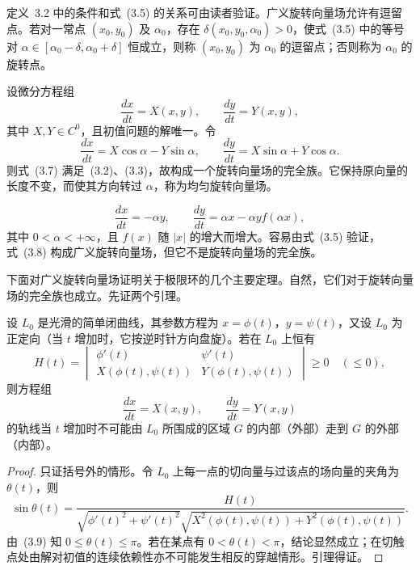 定义~3.2 中的条件和式~(3.5) 的关系可由读者验证。广义旋转向量场允许有逗留点。若对一常点 $(x_0,y_0)$ 及 $\alpha_0$，存在 $\delta(x_0,y_0,\alpha_0)>0$，使式~(3.5) 中的等号对 $\alpha\in[\alpha_0-\delta,\alpha_0+\delta]$ 恒成立，则称 $(x_0,y_0)$ 为 $\alpha_0$ 的逗留点；否则称为 $\alpha_0$ 的旋转点。

\begin{example}{}{}
设微分方程组
\[
 \dfrac{dx}{dt}=X(x,y),\qquad \dfrac{dy}{dt}=Y(x,y), \tag{3.6}
\]
其中 $X,Y\in C^0$，且初值问题的解唯一。令
\[
 \dfrac{dx}{dt}=X\cos\alpha-Y\sin\alpha,\qquad
 \dfrac{dy}{dt}=X\sin\alpha+Y\cos\alpha. \tag{3.7}
\]
则式~(3.7) 满足~(3.2)、(3.3)，故构成一个旋转向量场的完全族。它保持原向量的长度不变，而使其方向转过 $\alpha$，称为均匀旋转向量场。
\end{example}

\begin{example}{}{}
\[
 \dfrac{dx}{dt}=-\alpha y,\qquad
 \dfrac{dy}{dt}=\alpha x-\alpha y f(\alpha x), \tag{3.8}
\]
其中 $0<\alpha<+\infty$，且 $f(x)$ 随 $|x|$ 的增大而增大。容易由式~(3.5) 验证，式~(3.8) 构成广义旋转向量场，但它不是旋转向量场的完全族。
\end{example}

下面对广义旋转向量场证明关于极限环的几个主要定理。自然，它们对于旋转向量场的完全族也成立。先证两个引理。

\begin{lemma}{}{}
设 $L_0$ 是光滑的简单闭曲线，其参数方程为
$x=\phi(t)$，$y=\psi(t)$，又设 $L_0$ 为正定向（当 $t$ 增加时，它按逆时针方向盘旋）。若在 $L_0$ 上恒有
\[
 H(t)=
 \begin{vmatrix}
 \phi'(t)&\psi'(t)\\
 X(\phi(t),\psi(t))&Y(\phi(t),\psi(t))
 \end{vmatrix}\geq0\quad(\leq0), \tag{3.9}
\]
则方程组
\[
 \dfrac{dx}{dt}=X(x,y),\qquad \dfrac{dy}{dt}=Y(x,y) \tag{3.10}
\]
的轨线当 $t$ 增加时不可能由 $L_0$ 所围成的区域 $G$ 的内部（外部）走到 $G$ 的外部（内部）。
\end{lemma}

\begin{proof}
只证括号外的情形。令 $L_0$ 上每一点的切向量与过该点的场向量的夹角为 $\theta(t)$，则
\[
 \sin\theta(t)=
 \dfrac{H(t)}{\sqrt{\phi'(t)^2+\psi'(t)^2}\sqrt{X^2(\phi(t),\psi(t))+Y^2(\phi(t),\psi(t))}}. \tag{3.11}
\]
由~(3.9) 知 $0\leq\theta(t)\leq\pi$。若在某点有 $0<\theta(t)<\pi$，结论显然成立；在切触点处由解对初值的连续依赖性亦不可能发生相反的穿越情形。引理得证。
\end{proof}

